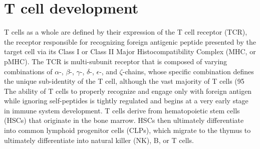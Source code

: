 \section{T cell development}
T cells as a whole are defined by their expression of the T cell receptor (TCR), the receptor responsible for recognizing foreign antigenic peptide presented by the target cell via its Class I or Class II Major Histocompatibility Complex (MHC, or pMHC). The TCR is multi-subunit receptor that is composed of varying combinations of $\alpha$-, $\beta$-, $\gamma$-, $\delta$-, $\epsilon$-, and $\zeta$-chains, whose specific combination defines the unique sub-identity of the T cell, although the vast majority of T cells (95%
The ability of T cells to properly recognize and engage only with foreign antigen while ignoring self-peptides is tightly regulated and begins at a very early stage in immune system development. T cells derive from hematopoietic stem cells (HSCs) that originate in the bone marrow. HSCs then ultimately differentiate into common lymphoid progenitor cells (CLPs), which migrate to the thymus to ultimately differentiate into natural killer (NK), B, or T cells. 

